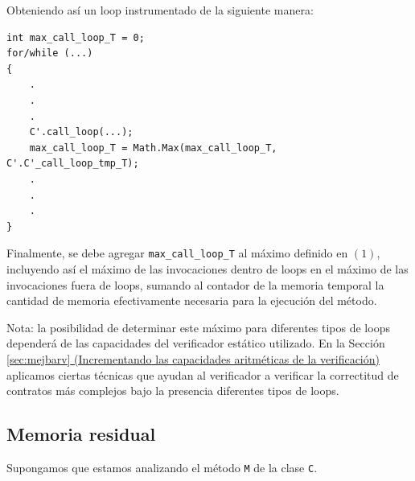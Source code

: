 \documentclass[12pt,a4paper]{article}
\newcommand\mono[1]{\texttt{#1}}
\begin{document}
				Obteniendo así un loop instrumentado de la siguiente manera:

				\vspace{15pt}
				\begin{lstlisting}[caption=Loop instrumentado]
int max_call_loop_T = 0;
for/while (...)
{
	.
	.
	.
	C'.call_loop(...);
	max_call_loop_T = Math.Max(max_call_loop_T, C'.C'_call_loop_tmp_T);
	.
	.
	.
}
				\end{lstlisting}

				Finalmente, se debe agregar \mono{max\_call\_loop\_T} al máximo definido en $(1)$, incluyendo así el máximo de las invocaciones dentro de loops en el máximo de las invocaciones fuera de loops, sumando al contador de la memoria temporal la cantidad de memoria efectivamente necesaria para la ejecución del método.

				Nota: la posibilidad de determinar este máximo para diferentes tipos de loops dependerá de las capacidades del verificador estático utilizado. En la Sección \hyperref[sec:mejbarv]{\ref*{sec:mejbarv} (Incrementando las capacidades aritméticas de la verificación)} aplicamos ciertas técnicas que ayudan al verificador a verificar la correctitud de contratos más complejos bajo la presencia diferentes tipos de loops.
		\subsection{Memoria residual}
			Supongamos que estamos analizando el método \mono{M} de la clase \mono{C}.
\end{document}
